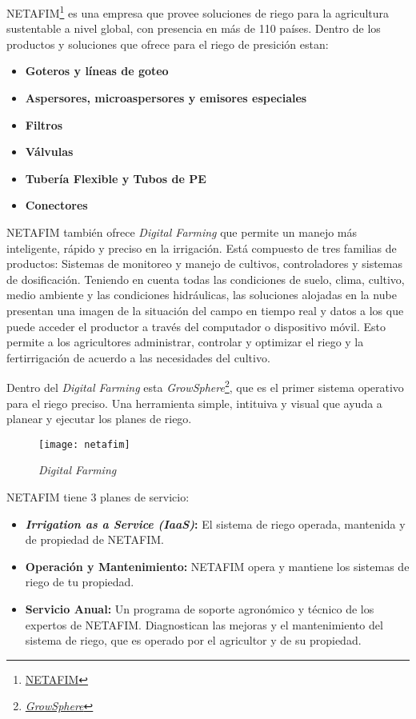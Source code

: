 NETAFIM\footnote{\href{https://www.netafim.com/en/}{NETAFIM}} es una empresa que provee soluciones de riego para la agricultura sustentable a nivel global, con presencia en más de 110 países.
Dentro de los productos y soluciones que ofrece para el riego de presición estan:
\begin{itemize}
    \item \textbf{Goteros y líneas de goteo} 
    \item \textbf{Aspersores, microaspersores y emisores especiales}
    \item \textbf{Filtros}
    \item \textbf{Válvulas}
    \item \textbf{Tubería Flexible y Tubos de PE}
    \item \textbf{Conectores}        
\end{itemize}
NETAFIM también ofrece \textit{Digital Farming} que permite un manejo más inteligente, rápido y preciso en la irrigación. Está compuesto de tres familias de productos: Sistemas de monitoreo y manejo de cultivos, controladores y sistemas de dosificación.
Teniendo en cuenta todas las condiciones de suelo, clima, cultivo, medio ambiente y las condiciones hidráulicas, las soluciones alojadas en la nube presentan una imagen de la situación del campo en tiempo real y datos a los que puede acceder el productor a través del computador o dispositivo móvil. Esto permite a los agricultores administrar, controlar y optimizar el riego y la fertirrigación de acuerdo a las necesidades del cultivo.

Dentro del \textit{Digital Farming} esta \textit{GrowSphere}\footnote{\href{https://www.netafim.com/en/digital-farming/}{\textit{GrowSphere}}}, que es el primer sistema operativo para el riego preciso. Una herramienta simple, intituiva y visual que ayuda a planear y ejecutar los planes de riego.
\begin{figure}[H]
	\centering
	\texttt{[image: netafim]}
	\caption{\label{fig:netafim} \textit{Digital Farming}}
\end{figure}

NETAFIM tiene 3 planes de servicio:
\begin{itemize}
    \item \textbf{\textit{Irrigation as a Service (IaaS)}:} El sistema de riego operada, mantenida y de propiedad de NETAFIM. 
    \item \textbf{Operación y Mantenimiento:} NETAFIM opera y mantiene los sistemas de riego de tu propiedad.
    \item \textbf{Servicio Anual:} Un programa de soporte agronómico y técnico de los expertos de NETAFIM. Diagnostican las mejoras y el mantenimiento del sistema de riego, que es operado por el agricultor y de su propiedad.
\end{itemize}


